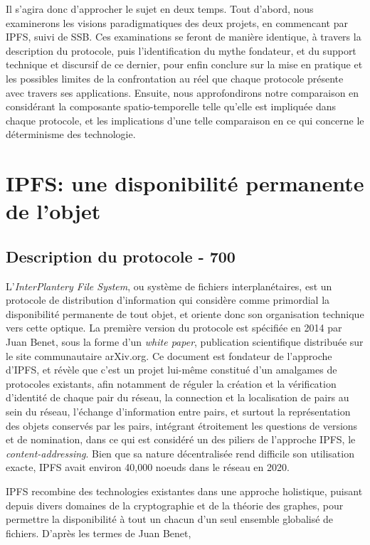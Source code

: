 \documentclass{article}
\begin{document}
Il s'agira donc d'approcher le sujet en deux temps. Tout d'abord, nous examinerons les visions paradigmatiques des deux projets, en commencant par IPFS, suivi de SSB. Ces examinations se feront de manière identique, à travers la description du protocole, puis l'identification du mythe fondateur, et du support technique et discursif de ce dernier, pour enfin conclure sur la mise en pratique et les possibles limites de la confrontation au réel que chaque protocole présente avec travers ses applications. Ensuite, nous approfondirons notre comparaison en considérant la composante spatio-temporelle telle qu'elle est impliquée dans chaque protocole, et les implications d'une telle comparaison en ce qui concerne le déterminisme des technologie.

\section{IPFS: une disponibilité permanente de l'objet}

\subsection{Description du protocole - 700}

L'\emph{InterPlantery File System}, ou système de fichiers interplanétaires, est un protocole de distribution d'information qui considère comme primordial la disponibilité permanente de tout objet, et oriente donc son organisation technique vers cette optique. La première version du protocole est spécifiée en 2014 par Juan Benet, sous la forme d'un \emph{white paper}, publication scientifique distribuée sur le site communautaire arXiv.org. Ce document est fondateur de l'approche d'IPFS, et révèle que c'est un projet lui-même constitué d'un amalgames de protocoles existants, afin notamment de réguler la création et la vérification d'identité de chaque pair du réseau, la connection et la localisation de pairs au sein du réseau, l'échange d'information entre pairs, et surtout la représentation des objets conservés par les pairs, intégrant étroitement les questions de versions et de nomination, dans ce qui est considéré un des piliers de l'approche IPFS, le \emph{content-addressing}\cite{benet_ipfs_2014}. Bien que sa nature décentralisée rend difficile son utilisation exacte, IPFS avait environ 40,000 noeuds dans le réseau en 2020\cite{henningsen_mapping_2020}.

IPFS recombine des technologies existantes dans une approche holistique, puisant depuis divers domaines de la cryptographie et de la théorie des graphes, pour permettre la disponibilité à tout un chacun d'un seul ensemble globalisé de fichiers. D'après les termes de Juan Benet,
\end{document}
